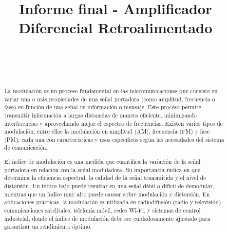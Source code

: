 \documentclass[conference]{IEEEtran}
\begin{document}
	
	\title{Informe final - Amplificador Diferencial Retroalimentado}
	\author{
		\\
		\\
		\\
		\and
		\and
		\and
	}
	
	\maketitle
	\begin{abstract}
		La modulación es un proceso fundamental en las telecomunicaciones que consiste en variar una o más propiedades de una señal portadora (como amplitud, frecuencia o fase) en función de una señal de información o mensaje. Este proceso permite transmitir información a largas distancias de manera eficiente, minimizando interferencias y aprovechando mejor el espectro de frecuencias. Existen varios tipos de modulación, entre ellos la modulación en amplitud (AM), frecuencia (FM) y fase (PM), cada una con características y usos específicos según las necesidades del sistema de comunicación.
		
		El índice de modulación es una medida que cuantifica la variación de la señal portadora en relación con la señal moduladora. Su importancia radica en que determina la eficiencia espectral, la calidad de la señal transmitida y el nivel de distorsión. Un índice bajo puede resultar en una señal débil o difícil de demodular, mientras que un índice muy alto puede causar sobre modulación y distorsión. En aplicaciones prácticas, la modulación es utilizada en radiodifusión (radio y televisión), comunicaciones satelitales, telefonía móvil, redes Wi-Fi, y sistemas de control industrial, donde el índice de modulación debe ser cuidadosamente ajustado para garantizar un rendimiento óptimo.
	\end{abstract}
	
\end{document}
